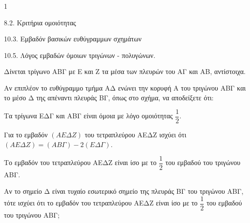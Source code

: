 \begin{ylh}{1}
    \item 8.2. Κριτήρια ομοιότητας
    \item 10.3. Εμβαδόν βασικών ευθύγραμμων σχημάτων
    \item 10.5. Λόγος εμβαδών όμοιων τριγώνων - πολυγώνων.
\end{ylh}
\begin{figure} %
\centering
{}
\end{figure}
Δίνεται τρίγωνο ΑΒΓ με Ε και Ζ τα μέσα των πλευρών του ΑΓ και ΑΒ, αντίστοιχα.
\begin{alist}
\item Αν επιπλέον το ευθύγραμμο τμήμα ΑΔ ενώνει την κορυφή Α του τριγώνου ΑΒΓ και το μέσο Δ της απέναντι πλευράς ΒΓ, όπως στο σχήμα, να αποδείξετε ότι:
    \begin{rlist}
        \item Τα τρίγωνα ΕΔΓ και ΑΒΓ είναι όμοια με λόγο ομοιότητας $\dfrac{1}{2}$.
        \item Για το εμβαδόν $(ΑΕΔΖ)$ του τετραπλεύρου ΑΕΔΖ ισχύει ότι $(ΑΕΔΖ) = (ΑΒΓ) - 2(ΕΔΓ)$.
        \item Το εμβαδόν του τετραπλεύρου ΑΕΔΖ είναι ίσο με το $\dfrac{1}{2}$ του εμβαδού του τριγώνου ΑΒΓ. 
    \end{rlist}
\item Αν το σημείο Δ είναι τυχαίο εσωτερικό σημείο της πλευράς ΒΓ του τριγώνου ΑΒΓ, τότε ισχύει ότι το εμβαδόν του τετραπλεύρου ΑΕΔΖ είναι ίσο με το $\dfrac{1}{2}$ του εμβαδού του τριγώνου ΑΒΓ; 
\end{alist}